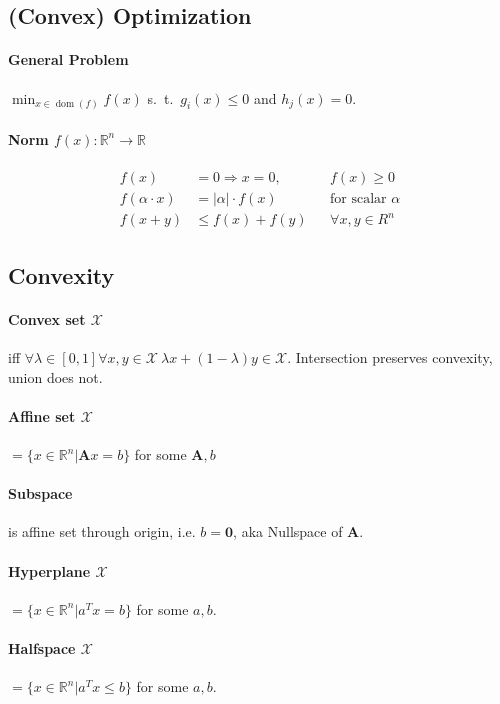 \documentclass[landscape,a4paper,8pt]{scrartcl}
\renewcommand{\implies}{\Rightarrow}
\newcommand{\mc}[1]{\mathcal{#1}}
\newcommand{\R}{\mathbb R}
\newcommand\vA{\bm{A}}
\DeclareMathOperator\dom{dom}
\begin{document}
\begin{multicols*}{3}
\section{(Convex) Optimization}

\paragraph{General Problem}
$\min_{x \in \dom(f)} f(x)$ s.\ t.\ $g_i(x) \leq 0$ and $h_j(x) = 0.$

\paragraph{Norm $f(x): \R^n \rightarrow \R$}
\begin{align*}
f(x) & = 0 \implies x = 0, && f(x) \geq 0 \\
f(\alpha \cdot x) & = |\alpha|\cdot f(x) && \text{for scalar } \alpha \\
f(x+y) & \leq f(x) + f(y) && \forall x, y \in R^n
\end{align*}

\subsection{Convexity}
\paragraph{Convex set $\mc X$} iff $\forall \lambda \in [0, 1] \forall x, y \in \mc X\ \lambda x + (1-\lambda) y \in \mc X$.
Intersection preserves convexity, union does not.
\paragraph{Affine set $\mc X$} $= \{ x \in \R^n | \vA x = b \}$ for some $\vA,b$
\paragraph{Subspace} is affine set through origin, i.e. $b = \bm 0$, aka Nullspace of $\vA$.
\paragraph{Hyperplane $\mc X$} $= \{ x \in \R^n | a^T x = b \}$ for some $a, b$.
\paragraph{Halfspace $\mc X$} $= \{ x \in \R^n | a^T x \leq b \}$ for some $a, b$.

\end{multicols*}
\end{document}
